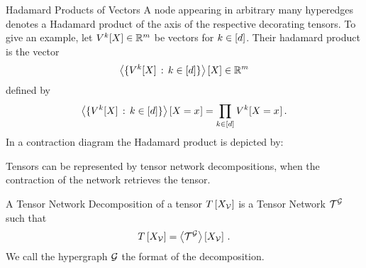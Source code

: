 %        

\begin{example}{Hadamard Products of Vectors}\label{exa:hadamard}
	A node appearing in arbitrary many hyperedges denotes a Hadamard product of the axis of the respective decorating tensors.
	To give an example, let $V^{k}[X]\in\mathbb{R}^m$ be vectors for $k\in[d]$. Their hadamard product is the vector
		\[ \left\langle \{V^{k}[X] \, : \, k\in[d]\}\right\rangle \left[ X \right]  \in \mathbb{R}^m \]
	defined by
		\[ \left\langle \{V^{k}[X] \, : \, k\in[d]\}\right\rangle \left[ X_{}=x_{} \right]
		= \prod_{k\in[d]} V^{k}[X_{}=x_{}]\, . \]
	In a contraction diagram the Hadamard product is depicted by: %
	\begin{center}
		
	\end{center}
\end{example}





Tensors can be represented by tensor network decompositions, when the contraction of the network retrieves the tensor.

\begin{definition}\label{def:tnDecomposition}
	A Tensor Network Decomposition of a tensor $T\left[X_{\mathcal{V}}\right]$ is a Tensor Network $\mathcal{T}^{\mathcal{G}}$ such that
		\[ T\left[X_{\mathcal{V}}\right]= \left\langle \mathcal{T}^{\mathcal{G}}\right\rangle \left[ X_{\mathcal{V}} \right] \, . \]
	We call the hypergraph $\mathcal{G}$ the format of the decomposition.
\end{definition}



